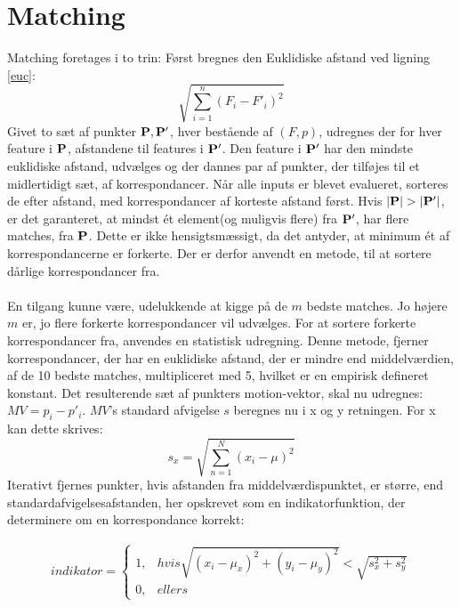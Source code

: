 \section{Matching}
Matching foretages i to trin: Først bregnes den Euklidiske afstand ved ligning \eqref{euc}:
\begin{equation}
\sqrt{\sum\limits_{i=1}^n(F_i-F'_i)^2}
\label{euc}
\end{equation}
Givet to sæt af punkter $\bold{P}, \bold{P}'$, hver bestående af $(F, p)$, udregnes der for hver feature i $\bold{P}$, afstandene til features i $\bold{P}'$. Den feature i $\bold{P}'$ har den mindste euklidiske afstand, udvælges og der dannes par af punkter, der tilføjes til et midlertidigt sæt, af korrespondancer. Når alle inputs er blevet evalueret, sorteres de efter afstand, med korrespondancer af korteste afstand først. Hvis $|\bold{P}| > |\bold{P}'|$, er det garanteret, at mindst ét element(og muligvis flere) fra $\bold{P}'$, har flere matches, fra $\bold{P}$. Dette er ikke hensigtsmæssigt, da det antyder, at minimum ét af korrespondancerne er forkerte. Der er derfor anvendt en metode, til at sortere dårlige korrespondancer fra.
\\
\\
En tilgang kunne være, udelukkende at kigge på de $m$ bedste matches. Jo højere $m$ er, jo flere forkerte korrespondancer vil udvælges. For at sortere forkerte korrespondancer fra, anvendes en statistisk udregning. Denne metode, fjerner korrespondancer, der har en euklidiske afstand, der er mindre end middelværdien, af de 10 bedste matches, multipliceret med 5, hvilket er en empirisk defineret konstant. Det resulterende sæt af punkters motion-vektor, skal nu udregnes: $MV = p_i - p'_i$. 
$MV$'s standard afvigelse $s$ beregnes nu i x og y retningen. For x kan dette skrives: 
\begin{equation}
s_x = \sqrt{ \sum \limits_{n=1}^N (x_i  - \mu)^2 }
\label{pis}
\end{equation}
Iterativt fjernes punkter, hvis afstanden fra middelværdispunktet, er større, end standardafvigelsesafstanden, her opskrevet som en indikatorfunktion, der determinere om en korrespondance korrekt:

\begin{equation}
\begin{split}
indikator = 
\begin{cases}
1,&hvis \sqrt{(x_i - \mu_x)^2 + (y_i - \mu_y)^2} < \sqrt{s_x^2 + s_y^2} \\
0,& ellers
\end{cases}
\end{split}
\label{indikator}
\end{equation}


